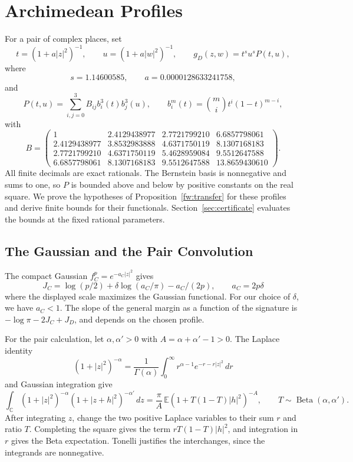 \section{Archimedean Profiles}
\label{pf:section}

For a pair of complex places, set
\[
 t=(1+a|z|^2)^{-1},\qquad u=(1+a|w|^2)^{-1},\qquad
 g_D(z,w)=t^su^sP(t,u),
\]
where
\[
 s=1.14600585,\qquad a=0.0000128633241758,
\]
and
\[
 P(t,u)=\sum_{i,j=0}^3 B_{ij}b_i^3(t)b_j^3(u),\qquad
 b_i^m(t)=\binom mi t^i(1-t)^{m-i},
\]
with
\begin{equation}\label{pf:bernstein-witness}
 B=\begin{pmatrix}
 1&2.4129438977&2.7721799210&6.6857798061\\
 2.4129438977&3.8532983888&4.6371750119&8.1307168183\\
 2.7721799210&4.6371750119&5.4628959084&9.5512647588\\
 6.6857798061&8.1307168183&9.5512647588&13.8659430610
 \end{pmatrix}.
\end{equation}
All finite decimals are exact rationals. The Bernstein basis is
nonnegative and sums to one, so $P$ is bounded above and below by
positive constants on the real square. We prove the hypotheses of
Proposition~\ref{fw:transfer} for these profiles and derive finite bounds
for their functionals. Section~\ref{sec:certificate} evaluates the
bounds at the fixed rational parameters.

\subsection{The Gaussian and the Pair Convolution}
The compact Gaussian $f_C^p=e^{-a_C|z|^2}$ gives
\begin{equation}\label{pf:gaussian-compact}
 J_C=\log(p/2)+\delta\log(a_C/\pi)-a_C/(2p),\qquad
 a_C=2p\delta
\end{equation}
where the displayed scale maximizes the Gaussian functional. For our
choice of $\delta$, we have $a_C<1$. The slope of the general margin as
a function of the signature
is $-\log\pi-2J_C+J_D$, and depends on the chosen profile.

For the pair calculation, let $\alpha,\alpha'>0$ with
$A=\alpha+\alpha'-1>0$. The Laplace identity
\[
 (1+|z|^2)^{-\alpha}
 =\frac1{\Gamma(\alpha)}\int_0^\infty
 r^{\alpha-1}e^{-r-r|z|^2}\,dr
\]
and Gaussian integration give
\begin{equation}\label{pf:laplace-convolution}
 \int_{\mathbb C}(1+|z|^2)^{-\alpha}
          (1+|z+h|^2)^{-\alpha'}\,dz
 =\frac\pi A\,
 \mathbb E(1+T(1-T)|h|^2)^{-A},
 \qquad T\sim\operatorname{Beta}(\alpha,\alpha').
\end{equation}
After integrating $z$, change the two positive Laplace variables to their
sum $r$ and ratio $T$. Completing the square gives the term
$rT(1-T)|h|^2$, and integration in $r$ gives the Beta expectation.
Tonelli justifies the interchanges, since the integrands are nonnegative.

